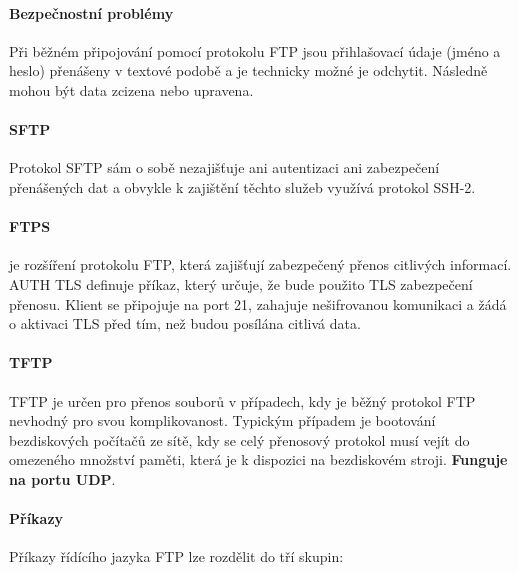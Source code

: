 \documentclass[10pt,a4paper]{article}
\begin{document}
\paragraph{Bezpečnostní problémy} Při běžném připojování pomocí protokolu FTP jsou přihlašovací údaje (jméno a heslo) přenášeny v textové podobě a je technicky možné je odchytit. Následně mohou být data zcizena nebo upravena.
\paragraph{SFTP} Protokol SFTP sám o sobě nezajišťuje ani autentizaci ani zabezpečení přenášených dat a obvykle k zajištění těchto služeb využívá protokol SSH-2.
\paragraph{FTPS} je rozšíření protokolu FTP, která zajišťují zabezpečený přenos citlivých informací. AUTH TLS definuje příkaz, který určuje, že bude použito TLS zabezpečení přenosu. Klient se připojuje na port 21, zahajuje nešifrovanou komunikaci a žádá o aktivaci TLS před tím, než budou posílána citlivá data.
\paragraph{TFTP} TFTP je určen pro přenos souborů v případech, kdy je běžný protokol FTP nevhodný pro svou komplikovanost. Typickým případem je bootování bezdiskových počítačů ze sítě, kdy se celý přenosový protokol musí vejít do omezeného množství paměti, která je k dispozici na bezdiskovém stroji. \textbf{Funguje na portu UDP}.
\paragraph{Příkazy}
Příkazy řídícího jazyka FTP lze rozdělit do tří skupin:
\end{document}
